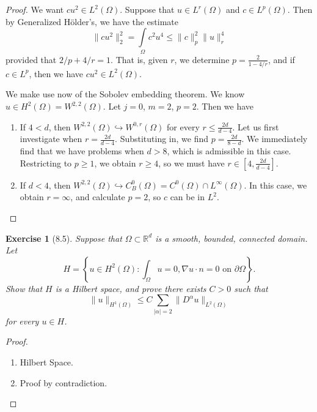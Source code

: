 \documentclass[letterpaper,twoside,11pt]{article}
\theoremstyle{mystyle}
\newtheorem*{exercise}{Exercise}
\newcommand{\R}{{\mathbb R}}
\begin{document}
\begin{proof}
  We want $cu^2 \in L^2 \left( \Omega \right)$. Suppose that $u \in L^r \left( \Omega \right)$ and $c \in L^p (\Omega)$. Then by Generalized H\"older's, we have the estimate
  \[\|cu^2 \|_2^2 = \int\limits_\Omega c^2 u^4 \leq \|c\|_p^2 \|u\|_r^4 \]
  provided that $2/p+4/r=1$. That is, given $r$, we determine $p = \frac{2}{1-4/r}$, and if $c \in L^p$, then we have $c u ^2 \in L^2 \left( \Omega \right)$.  

  We make use now of the Sobolev embedding theorem. We know $ u \in H^2 \left( \Omega \right) = W^{2, 2} \left( \Omega \right)$. Let $j = 0$, $m = 2$, $p = 2$. Then we have 
  \begin{enumerate}
    \item If $4 < d$, then $W^{2,2} (\Omega) \hookrightarrow W^{0,r}\left( \Omega \right)$ for every $r\leq \frac{2d}{d-4}$. Let us first investigate when $r = \frac{2d}{d-4}$. Substituting in, we find $p = \frac{2d}{8-d}$. We immediately find that we have problems when $ d > 8$, which is admissible in this case. Restricting to $p \geq 1$, we obtain $ r \geq 4$, so we must have $ r \in [4, \frac{2d}{d-4}]$. 
    
    \item If $d < 4$, then $W^{2,2} (\Omega) \hookrightarrow C_B^0 (\Omega) = C^0 (\Omega) \cap L^\infty (\Omega)$. In this case, we obtain $ r = \infty$, and calculate $ p = 2$, so $c$ can be in $L^2$. 
  \end{enumerate}
\end{proof}





\newpage
\begin{exercise}[8.5]
  Suppose that $\Omega \subset \R^d$ is a smooth, bounded, connected domain. Let 
  \[H = \left\{ u \in H^2 \left( \Omega \right)  : \int_\Omega u = 0, \nabla u \cdot n = 0 \text{ on } \partial \Omega  \right\}.\]
  Show that $H$ is a Hilbert space, and prove there exists $C > 0$ such that 
  \[\|u\|_{H^1 \left( \Omega \right) } \leq C \sum_{|\alpha| = 2} \|D^\alpha u \|_{L^2 (\Omega)}\]
  for every $u \in H$. 
\end{exercise}

\begin{proof}
  \begin{enumerate}
    \item Hilbert Space.
    \item Proof by contradiction. 
  \end{enumerate}
\end{proof}
\end{document}
